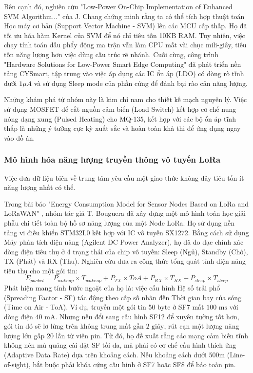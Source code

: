 Bên cạnh đó, nghiên cứu "Low-Power On-Chip Implementation of Enhanced SVM Algorithm..." \cite{chang2022low} của J. Chang chứng minh rằng ta có thể tích hợp thuật toán Học máy cơ bản (Support Vector Machine - SVM) lên các MCU cấp thấp. Họ đã tối ưu hóa hàm Kernel của SVM để nó chỉ tiêu tốn 10KB RAM. Tuy nhiên, việc chạy tính toán dấu phẩy động ma trận vẫn làm CPU mất vài chục mili-giây, tiêu tốn năng lượng hơn việc dùng cấu trúc rẽ nhánh. Cuối cùng, công trình "Hardware Solutions for Low-Power Smart Edge Computing" \cite{wisniewski2022hardware} đã phát triển nền tảng CYSmart, tập trung vào việc áp dụng các IC ổn áp (LDO) có dòng rò tĩnh dưới $1 \mu A$ và sử dụng Sleep mode của phần cứng để đánh bại rào cản năng lượng.

Những khám phá từ nhóm này là kim chỉ nam cho thiết kế mạch nguyên lý. Việc sử dụng MOSFET để cắt nguồn cảm biến (Load Switch) kết hợp cơ chế nung nóng dạng xung (Pulsed Heating) cho MQ-135, kết hợp với các bộ ổn áp tĩnh thấp là những ý tưởng cực kỳ xuất sắc và hoàn toàn khả thi để ứng dụng ngay vào đồ án.

\subsubsection{Mô hình hóa năng lượng truyền thông vô tuyến LoRa}
Việc đưa dữ liệu biên về trung tâm yêu cầu một giao thức không dây tiêu tốn ít năng lượng nhất có thể.

Trong bài báo "Energy Consumption Model for Sensor Nodes Based on LoRa and LoRaWAN" \cite{bouguera2018energy}, nhóm tác giả T. Bouguera đã xây dựng một mô hình toán học giải phẫu chi tiết toàn bộ hồ sơ năng lượng của một Node LoRa. Họ sử dụng nền tảng vi điều khiển STM32L0 kết hợp với IC vô tuyến SX1272. Bằng cách sử dụng Máy phân tích điện năng (Agilent DC Power Analyzer), họ đã đo đạc chính xác dòng điện tiêu thụ ở 4 trạng thái của chip vô tuyến: Sleep (Ngủ), Standby (Chờ), TX (Phát) và RX (Thu).
Nghiên cứu đưa ra công thức tổng quát tính điện năng tiêu thụ cho một gói tin:
\begin{equation}
    E_{packet} = P_{wakeup} \times T_{wakeup} + P_{TX} \times ToA + P_{RX} \times T_{RX} + P_{sleep} \times T_{sleep}
\end{equation}
Phát hiện mang tính bước ngoặt của họ là: việc cấu hình Hệ số trải phổ (Spreading Factor - SF) tác động theo cấp số nhân đến Thời gian bay của sóng (Time on Air - ToA). Ví dụ, truyền một gói tin 50 byte ở SF7 mất $100 \text{ ms}$ với dòng điện $40 \text{ mA}$. Nhưng nếu đổi sang cấu hình SF12 để xuyên tường tốt hơn, gói tin đó sẽ lơ lửng trên không trung mất gần $2 \text{ giây}$, rút cạn một lượng năng lượng lớn gấp 20 lần từ viên pin. Từ đó, họ đề xuất rằng các mạng cảm biến tĩnh không nên mù quáng cài đặt SF tối đa, mà phải có cơ chế cấu hình thích ứng (Adaptive Data Rate) dựa trên khoảng cách. Nếu khoảng cách dưới 500m (Line-of-sight), bắt buộc phải khóa cứng cấu hình ở SF7 hoặc SF8 để bảo toàn pin.


